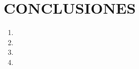 \chapter{CONCLUSIONES}
\thispagestyle{empty}
\begin{enumerate}[leftmargin=1em]
    \item \lipsum[1]
    \item \lipsum[2]
    \item \lipsum[3]
    \item \lipsum[4]
\end{enumerate}